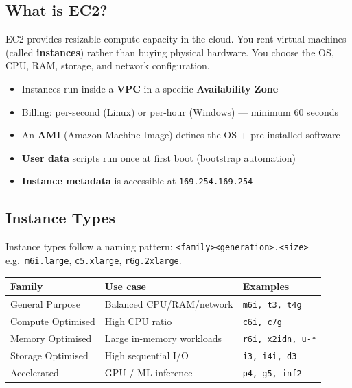 

\subsection{What is EC2?}

EC2 provides resizable compute capacity in the cloud. You rent virtual machines
(called \textbf{instances}) rather than buying physical hardware. You choose the
OS, CPU, RAM, storage, and network configuration.

\begin{keyfacts}
\begin{itemize}
  \item Instances run inside a \textbf{VPC} in a specific \textbf{Availability Zone}
  \item Billing: per-second (Linux) or per-hour (Windows) — minimum 60 seconds
  \item An \textbf{AMI} (Amazon Machine Image) defines the OS + pre-installed software
  \item \textbf{User data} scripts run once at first boot (bootstrap automation)
  \item \textbf{Instance metadata} is accessible at \texttt{169.254.169.254}
\end{itemize}
\end{keyfacts}

\subsection{Instance Types}

Instance types follow a naming pattern: \texttt{<family><generation>.<size>}
e.g.\ \texttt{m6i.large}, \texttt{c5.xlarge}, \texttt{r6g.2xlarge}.

\begin{comparebox}[title={Instance family cheat-sheet}]
\begin{tabular}{@{}lll@{}}
\toprule
\textbf{Family} & \textbf{Use case} & \textbf{Examples} \\
\midrule
General Purpose   & Balanced CPU/RAM/network  & \texttt{m6i, t3, t4g} \\
Compute Optimised & High CPU ratio           & \texttt{c6i, c7g}     \\
Memory Optimised  & Large in-memory workloads & \texttt{r6i, x2idn, u-*} \\
Storage Optimised & High sequential I/O       & \texttt{i3, i4i, d3}  \\
Accelerated       & GPU / ML inference        & \texttt{p4, g5, inf2} \\
\bottomrule
\end{tabular}
\end{comparebox}

